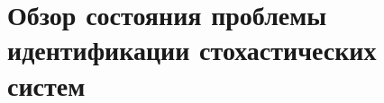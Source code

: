 \chapter[Обзор состояния проблемы идентификации стохастических систем]{%
  Обзор состояния проблемы идентификации стохастических систем
}










